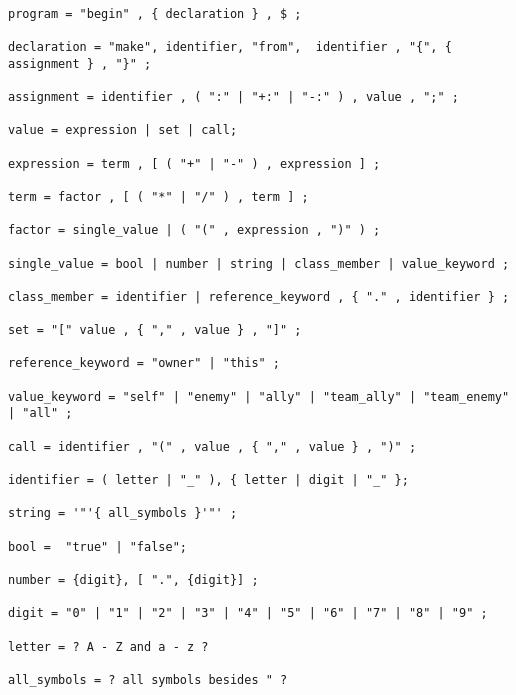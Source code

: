 {\begin{lstlisting}[numbers=none]

program = "begin" , { declaration } , $ ;

declaration = "make", identifier, "from",  identifier , "{", { assignment } , "}" ;

assignment = identifier , ( ":" | "+:" | "-:" ) , value , ";" ;

value = expression | set | call;

expression = term , [ ( "+" | "-" ) , expression ] ;

term = factor , [ ( "*" | "/" ) , term ] ;

factor = single_value | ( "(" , expression , ")" ) ;

single_value = bool | number | string | class_member | value_keyword ;

class_member = identifier | reference_keyword , { "." , identifier } ;

set = "[" value , { "," , value } , "]" ;

reference_keyword = "owner" | "this" ;

value_keyword = "self" | "enemy" | "ally" | "team_ally" | "team_enemy" | "all" ;

call = identifier , "(" , value , { "," , value } , ")" ;

identifier = ( letter | "_" ), { letter | digit | "_" };

string = '"'{ all_symbols }'"' ;

bool =  "true" | "false";

number = {digit}, [ ".", {digit}] ;

digit = "0" | "1" | "2" | "3" | "4" | "5" | "6" | "7" | "8" | "9" ;

letter = ? A - Z and a - z ?

all_symbols = ? all symbols besides " ?

\end{lstlisting}}
\pagebreak
